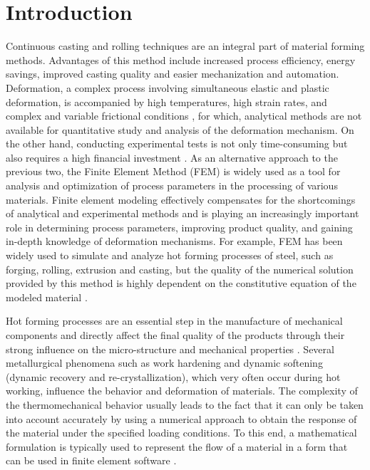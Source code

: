 \documentclass[twoside,english,1p,final,sort&compress]{elsarticle}
\theoremstyle{plain}
\begin{document}
\section{Introduction\label{sec:Introduction}}
Continuous casting and rolling techniques are an integral part of material forming methods.
Advantages of this method include increased process efficiency, energy savings, improved casting quality and easier mechanization and automation.
Deformation, a complex process involving simultaneous elastic and plastic deformation, is accompanied by high temperatures, high strain rates, and complex and variable frictional conditions \cite{He-2013}, for which, analytical methods are not available for quantitative study and analysis of the deformation mechanism.
On the other hand, conducting experimental tests is not only time-consuming but also requires a high financial investment \cite{Changizian-2012}.
As an alternative approach to the previous two, the Finite Element Method (FEM) is widely used as a tool for analysis and optimization of process parameters in the processing of various materials.
Finite element modeling effectively compensates for the shortcomings of analytical and experimental methods and is playing an increasingly important role in determining process parameters, improving product quality, and gaining in-depth knowledge of deformation mechanisms.
For example, FEM has been widely used to simulate and analyze hot forming processes of steel, such as forging, rolling, extrusion and casting, but the quality of the numerical solution provided by this method is highly dependent on the constitutive equation of the modeled material \cite{Qin-2010, Mandal-2009, Ji-2018}.

Hot forming processes are an essential step in the manufacture of mechanical components and directly affect the final quality of the products through their strong influence on the micro-structure and mechanical properties \cite{Ashtiani-2012}.
Several metallurgical phenomena such as work hardening and dynamic softening (dynamic recovery and re-crystallization), which very often occur during hot working, influence the behavior and deformation of materials.
The complexity of the thermomechanical behavior usually leads to the fact that it can only be taken into account accurately by using a numerical approach to obtain the response of the material under the specified loading conditions.
To this end, a mathematical formulation is typically used to represent the flow of a material in a form that can be used in finite element software \cite{Lin-2008-P, Wu-2012}.
\end{document}
